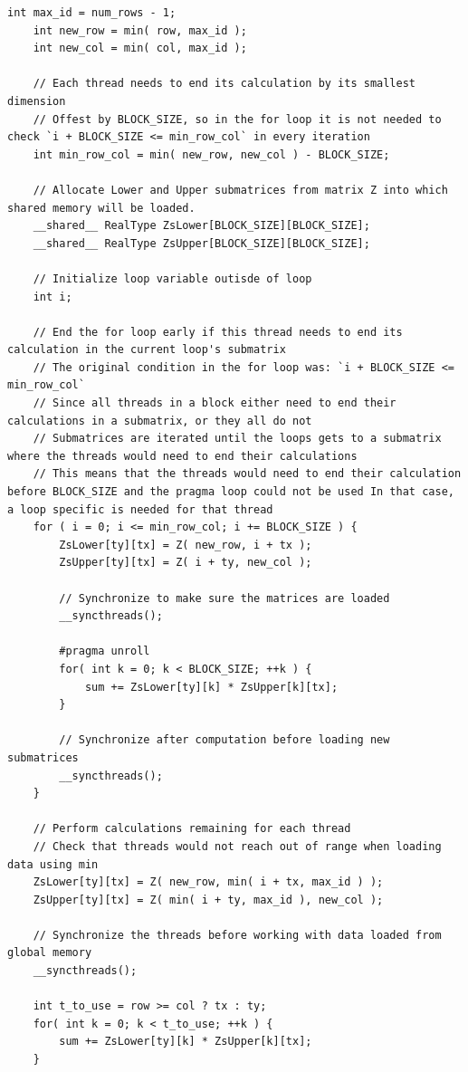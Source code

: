 \begin{lstlisting}[caption={Core of the decomposition kernel with the inefficient conditions replaced by a combinated of the \code{min()} function and helpful variables. Taken from the Decomposition project repository on GitLab\protect\footref{Footnote:decomposition-project-gitlab-url}.},label={Listing:implementation-optimization-elimination-of-conditions},escapechar=@]
	int max_id = num_rows - 1;
	int new_row = min( row, max_id );
	int new_col = min( col, max_id );
	
	// Each thread needs to end its calculation by its smallest dimension
	// Offest by BLOCK_SIZE, so in the for loop it is not needed to check `i + BLOCK_SIZE <= min_row_col` in every iteration
	int min_row_col = min( new_row, new_col ) - BLOCK_SIZE;
	
	// Allocate Lower and Upper submatrices from matrix Z into which shared memory will be loaded.
	__shared__ RealType ZsLower[BLOCK_SIZE][BLOCK_SIZE];
	__shared__ RealType ZsUpper[BLOCK_SIZE][BLOCK_SIZE];
	
	// Initialize loop variable outisde of loop
	int i;
	
	// End the for loop early if this thread needs to end its calculation in the current loop's submatrix
	// The original condition in the for loop was: `i + BLOCK_SIZE <= min_row_col`
	// Since all threads in a block either need to end their calculations in a submatrix, or they all do not
	// Submatrices are iterated until the loops gets to a submatrix where the threads would need to end their calculations
	// This means that the threads would need to end their calculation before BLOCK_SIZE and the pragma loop could not be used In that case, a loop specific is needed for that thread
	for ( i = 0; i <= min_row_col; i += BLOCK_SIZE ) {
		ZsLower[ty][tx] = Z( new_row, i + tx );
		ZsUpper[ty][tx] = Z( i + ty, new_col );
		
		// Synchronize to make sure the matrices are loaded
		__syncthreads();
		
		#pragma unroll
		for( int k = 0; k < BLOCK_SIZE; ++k ) {
			sum += ZsLower[ty][k] * ZsUpper[k][tx];
		}
		
		// Synchronize after computation before loading new submatrices
		__syncthreads();
	}
	
	// Perform calculations remaining for each thread
	// Check that threads would not reach out of range when loading data using min
	ZsLower[ty][tx] = Z( new_row, min( i + tx, max_id ) );
	ZsUpper[ty][tx] = Z( min( i + ty, max_id ), new_col );
	
	// Synchronize the threads before working with data loaded from global memory
	__syncthreads();
	
	int t_to_use = row >= col ? tx : ty;
	for( int k = 0; k < t_to_use; ++k ) {
		sum += ZsLower[ty][k] * ZsUpper[k][tx];
	}
\end{lstlisting}

